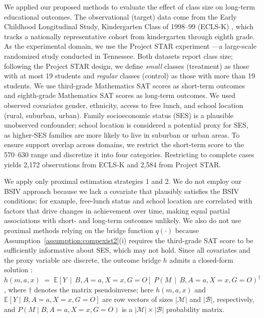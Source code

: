 \documentclass[10pt]{article}
\newcommand{\E}{\mathbb{E}}
\begin{document}
We applied our proposed methods to evaluate the effect of class size on long-term educational outcomes. The observational (target) data come from the Early Childhood Longitudinal Study, Kindergarten Class of 1998–99 (ECLS-K) \citep{tourangeau2009eclsk}, which tracks a nationally representative cohort from kindergarten through eighth grade. As the experimental domain, we use the Project STAR experiment \citep{DVN/SIWH9F_2008}—a large-scale randomized study conducted in Tennessee. Both datasets report class size; following the Project STAR design, we define \emph{small} classes (treatment) as those with at most 19 students and \emph{regular} classes (control) as those with more than 19 students. We use third-grade Mathematics SAT scores as short-term outcomes and eighth-grade Mathematics SAT scores as long-term outcomes. We used observed covariates gender, ethnicity, access to free lunch, and school location (rural, suburban, urban). Family socioeconomic status (SES) is a plausible unobserved confounder; school location is considered a potential proxy for SES, as higher-SES families are more likely to live in suburban or urban areas. To ensure support overlap across domains, we restrict the short-term score to the 570–630 range and discretize it into four categories. Restricting to complete cases yields 2,172 observations from ECLS-K and 2,584 from Project STAR.

\begin{sloppypar}
We apply only proximal estimation strategies 1 and 2. 
We do not employ our BSIV approach because we lack a covariate that plausibly satisfies the BSIV conditions; for example, free-lunch status and school location are correlated with factors that drive changes in achievement over time, making equal partial associations with short- and long-term outcomes unlikely. 
We also do not use proximal methods relying on the bridge function \(q(\cdot)\) because Assumption~\ref{assumption:compexist2}(i) requires the third-grade SAT score to be sufficiently informative about SES, which may not hold. Since all covariates and the proxy variable are discrete, the outcome bridge \(h\) admits a closed-form solution \citep{miao2018identifying}: 
$h(m,a,x)\;=\;\E\!\left[Y \,\middle|\, B, A=a, X=x, G=O\right]\; P\!\left(M \,\middle|\, B, A=a, X=x, G=O\right)^{\dagger}$,
where \({\dagger}\) denotes the matrix pseudoinverse; here \(h(m,a,x)\) and \(\E[Y \mid B, A=a, X=x, G=O]\) are row vectors of sizes \(|\mathcal{M}|\) and \(|\mathcal{B}|\), respectively, and \(P(M \mid B, A=a, X=x, G=O)\) is a \(|\mathcal{M}|\times|\mathcal{B}|\) probability matrix.
\end{sloppypar}
\end{document}
